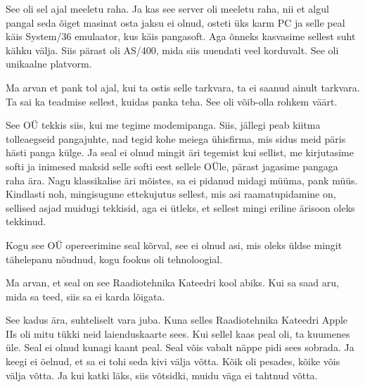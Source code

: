 
See oli sel ajal meeletu raha.  Ja kas see server oli meeletu raha, nii et 
algul pangal seda õiget masinat osta jaksu ei olnud, osteti üks karm 
PC ja selle peal käis System/36 emulaator, kus käis 
pangasoft. Aga õnneks kasvasime sellest suht kähku välja. Siis pärast oli 
AS/400, mida siis uuendati veel korduvalt. See oli 
unikaalne platvorm.

Ma arvan et pank tol ajal, kui ta ostis selle tarkvara, ta ei saanud ainult 
tarkvara. Ta sai ka teadmise sellest, kuidas panka teha. See oli võib-olla 
rohkem väärt.


See OÜ tekkis siis, kui me tegime modemipanga. Siis, jällegi peab kiitma 
tolleaegseid pangajuhte, nad tegid kohe meiega ühisfirma,  mis sidus meid päris 
hästi panga külge. Ja seal ei olnud mingit äri tegemist kui sellist, me 
kirjutasime softi ja inimesed maksid selle softi eest sellele OÜle, pärast 
jagasime pangaga raha ära. Nagu klassikalise äri mõistes, sa ei pidanud midagi 
müüma, pank müüs. Kindlasti noh, mingisugune ettekujutus sellest, mis asi 
raamatupidamine on,  sellised asjad muidugi tekkisid, aga  ei ütleks, et 
sellest mingi eriline ärisoon oleks tekkinud.

Kogu see OÜ  opereerimine seal kõrval,  see  ei olnud asi, mis oleks üldse 
mingit tähelepanu nõudnud, kogu fookus oli tehnoloogial.


Ma arvan, et seal on see Raadiotehnika Kateedri kool abiks. Kui sa saad aru, 
mida sa teed, siis sa ei karda lõigata.


See kadus ära, suhteliselt vara juba. Kuna selles Raadiotehnika Kateedri Apple 
IIs oli mitu tükki neid laienduskaarte sees. Kui sellel 
kaas peal oli, ta  kuumenes üle. Seal ei olnud kunagi kaant peal. Seal võis 
vabalt näppe pidi sees sobrada. Ja keegi  ei öelnud, et sa ei tohi seda kivi 
välja võtta. Kõik oli pesades, kõike võis välja võtta.  Ja kui katki läks, siis 
võtsidki, muidu väga ei tahtnud võtta. 

